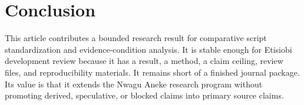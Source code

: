 \documentclass[sigconf,nonacm]{acmart}
\begin{document}
\section{Conclusion}
This article contributes a bounded research result for comparative script
standardization and evidence-condition analysis. It is stable enough for
Etisiobi development review because it has a result, a method, a claim ceiling,
review files, and reproducibility materials. It remains short of a finished
journal package. Its value is that it extends the Nwagu Aneke research program
without promoting derived, speculative, or blocked claims into primary source
claims.



\end{document}
